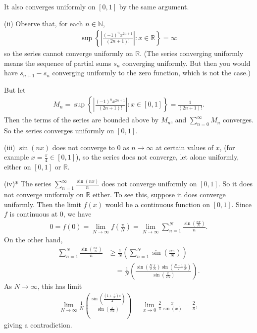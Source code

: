\documentclass[letterpaper,10pt,english]{jupyterBook}
\begin{document}
\sphinxAtStartPar
It also converges uniformly on \([0,1]\) by the same argument.

\sphinxAtStartPar
(ii) Observe that, for each \(n\in \mathbb{N}\),
\begin{equation*}
\begin{split}
\sup \left\{ \left| \frac{(-1)^nx^{2n+1}}{(2n+1)!} \right| : x\in \mathbb{R} \right\} = \infty
\end{split}
\end{equation*}
\sphinxAtStartPar
so the series cannot converge uniformly on \(\mathbb{R}\). (The series converging uniformly means the sequence
of partial sums \(s_n\) converging uniformly. But then you would have \(s_{n+1}-s_n\) converging uniformly
to the zero function, which is not the case.)

\sphinxAtStartPar
But let
\begin{equation*}
\begin{split}
M_n = \sup \left\{ \left| \frac{(-1)^nx^{2n+1}}{(2n+1)!} \right|  : x\in [0,1] \right\} = \frac{1}{(2n+1)!}.
\end{split}
\end{equation*}
\sphinxAtStartPar
Then the terms of the series are bounded above by \(M_n\), and \(\sum_{n=0}^\infty M_n\) converges. So the series converges uniformly on \([0,1]\).

\sphinxAtStartPar
(iii) \(\sin (nx)\) does not converge to \(0\) as \(n\rightarrow \infty\) at certain values of \(x\), (for example \(x=\frac{\pi}{4}\in [0,1]\)),  so the series does not converge, let alone uniformly, either on \([0,1]\) or \(\mathbb{R}\).

\sphinxAtStartPar
(iv)* The series \(\sum_{n=1}^\infty  \frac{\sin (nx)}{n}\) does not converge uniformly on \([0,1]\). So it does not converge uniformly on \(\mathbb{R}\) either. To see this, suppose it does converge uniformly. Then the limit \(f(x)\) would be a continuous function on \([0,1]\). Since \(f\) is continuous at \(0\), we have
\begin{equation*}
\begin{split}
0=f(0)=\lim_{N\to\infty} f(\frac{\pi}{N})=\lim_{N\to\infty} \sum_{n=1}^N \frac{\sin\left(\frac{n\pi}{N}\right)}{n}.
\end{split}
\end{equation*}
\sphinxAtStartPar
On the other hand,
\begin{align*}
\sum_{n=1}^N \frac{\sin\left(\frac{n\pi}{N}\right)}{n}&\geq \frac{1}{N}\left( \sum_{n=1}^N \sin\left(\frac{n\pi}{N}\right)\right)\\
&\quad =\frac{1}{N}\left( \frac{\sin(\frac{N}{2}\frac{\pi}{N})\sin(\frac{N+1}{2}\frac{\pi}{N})}{\sin(\frac{\pi}{2N})}\right).
\end{align*}
\sphinxAtStartPar
As \( N\to \infty\), this has limit
\begin{equation*}
\begin{split}
\lim_{N\to\infty} \frac{1}{N}\left(\frac{\sin(\frac{\left(1+\frac{1}{N}\right)\pi}{2})}{\sin(\frac{\pi}{2N})}\right)
=\lim_{x\to 0}\frac{2}{\pi}\frac{x}{\sin(x)}=\frac{2}{\pi},
\end{split}
\end{equation*}
\sphinxAtStartPar
giving a contradiction.
\end{document}
